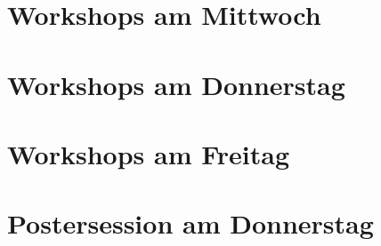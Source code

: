 \documentclass[
version=last,
toc=bib,
toc=graduated,
toc=index,
toc=listof,
fontsize=9pt,
parskip=false,
openany]{scrbook}
\begin{document}



 
\pagestyle{cropmarksstyle}
\begin{titlepage}
  \thispagestyle{page-title}
  \null
\end{titlepage}
\pagestyle{cropmarksstyle}




\clearpage
%
\section*{Workshops am Mittwoch}\label{mittwoch-workshops}

\vspace*{-1.5cm}
\section*{Workshops am Donnerstag}\label{donnerstag-workshops}

\section*{Workshops am Freitag}\label{freitag-workshops}



\clearpage


\section*{Postersession am Donnerstag}\label{donnerstag-poster}

\clearpage





%

\end{document}
